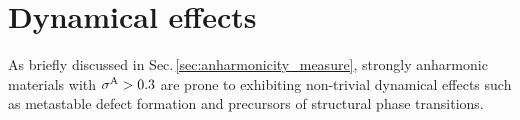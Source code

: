 




\newpage
\section{Dynamical effects}
\label{sec:dynamical_effects}
As briefly discussed in Sec.\,\ref{sec:anharmonicity_measure},
 strongly anharmonic materials with $\sigma^\mathrm{A} > 0.3$ are prone to exhibiting non-trivial dynamical effects such as metastable defect formation and precursors of structural phase transitions. 

